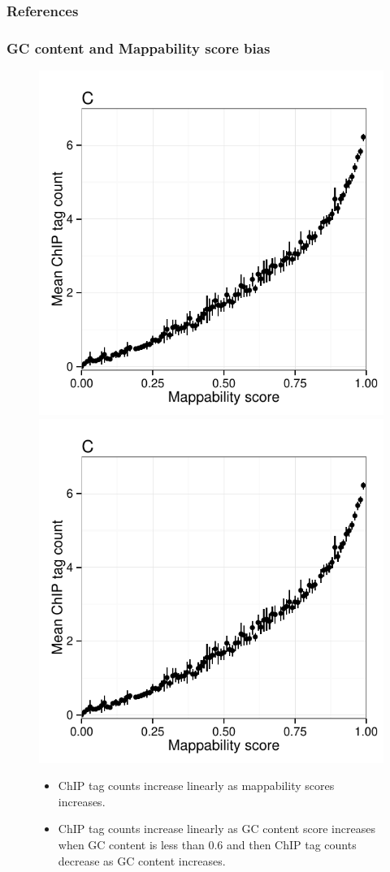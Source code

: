 \documentclass[compress,table,xcolor=dvipsnames]{beamer}\usepackage[]{graphicx}\usepackage[]{color}
\begin{document}
\begin{frame}[allowframebreaks]
  \frametitle{References}

{\tiny

\nocite{exo1}
\nocite{dpeak}



}

\end{frame}


\begin{frame}[label=gcmap]
\frametitle{GC content and Mappability score bias}

\begin{figure}[H]
  \centering
  \includegraphics[width = .46\textwidth,page = 1]{../figs/for_paper/eukaryotic_bias_CTCF.pdf}
  \includegraphics[width = .46\textwidth,page = 2]{../figs/for_paper/eukaryotic_bias_CTCF.pdf}

  \begin{itemize}
  \item ChIP tag counts increase linearly as mappability scores
    increases.
  \item ChIP tag counts increase linearly as GC content score
    increases when GC content is less than 0.6 and then ChIP tag
    counts decrease as GC content
    increases. \hyperlink{future}{}

  \end{itemize}


\end{figure}
  
\end{frame}
\end{document}
